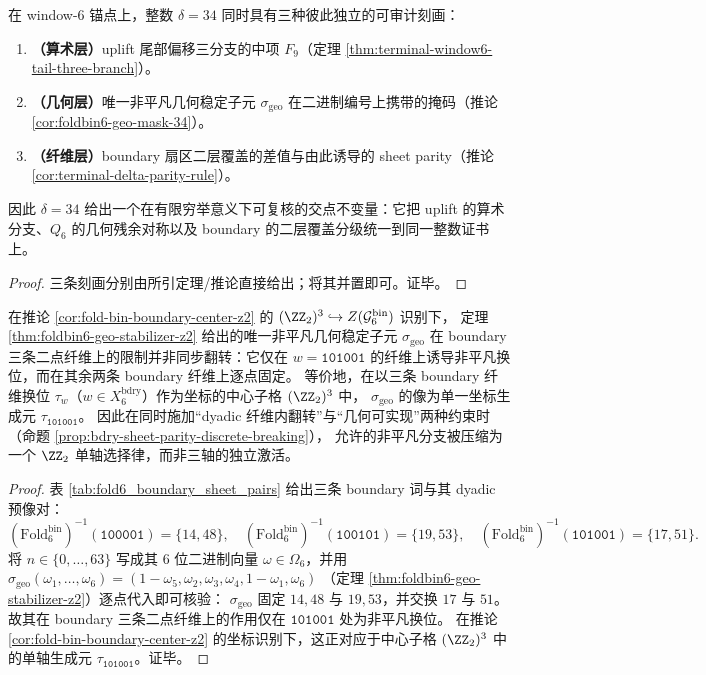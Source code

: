 \begin{corollary}[\texorpdfstring{$\delta=34$}{δ=34} 的三重同一性（算术/几何/纤维）]\label{cor:bdry-delta34-triple-identity}
在 window-\(6\) 锚点上，整数 \(\delta=34\) 同时具有三种彼此独立的可审计刻画：
\begin{enumerate}
  \item \textbf{（算术层）}uplift 尾部偏移三分支的中项 \(F_9\)（定理 \ref{thm:terminal-window6-tail-three-branch}）。
  \item \textbf{（几何层）}唯一非平凡几何稳定子元 \(\sigma_{\mathrm{geo}}\) 在二进制编号上携带的掩码（推论 \ref{cor:foldbin6-geo-mask-34}）。
  \item \textbf{（纤维层）}boundary 扇区二层覆盖的差值与由此诱导的 sheet parity（推论 \ref{cor:terminal-delta-parity-rule}）。
\end{enumerate}
因此 \(\delta=34\) 给出一个在有限穷举意义下可复核的交点不变量：它把 uplift 的算术分支、\(Q_6\) 的几何残余对称以及 boundary 的二层覆盖分级统一到同一整数证书上。
\end{corollary}
\begin{proof}
三条刻画分别由所引定理/推论直接给出；将其并置即可。证毕。
\end{proof}

\begin{corollary}\label{cor:bdry-sheet-parity-diagonal}
在推论 \ref{cor:fold-bin-boundary-center-z2} 的 \((\ZZ_2)^3\hookrightarrow Z(\mathcal{G}^{\mathrm{bin}}_6)\) 识别下，
定理 \ref{thm:foldbin6-geo-stabilizer-z2} 给出的唯一非平凡几何稳定子元 \(\sigma_{\mathrm{geo}}\)
在 boundary 三条二点纤维上的限制并非同步翻转：它仅在 \(w=\texttt{101001}\) 的纤维上诱导非平凡换位，而在其余两条 boundary 纤维上逐点固定。
等价地，在以三条 boundary 纤维换位 \(\tau_w\)（\(w\in X_6^{\mathrm{bdry}}\)）作为坐标的中心子格 \((\ZZ_2)^3\) 中，
\(\sigma_{\mathrm{geo}}\) 的像为单一坐标生成元 \(\tau_{\texttt{101001}}\)。
因此在同时施加“dyadic 纤维内翻转”与“几何可实现”两种约束时（命题 \ref{prop:bdry-sheet-parity-discrete-breaking}），
允许的非平凡分支被压缩为一个 \(\ZZ_2\) 单轴选择律，而非三轴的独立激活。
\end{corollary}
\begin{proof}
表 \ref{tab:fold6_boundary_sheet_pairs} 给出三条 boundary 词与其 dyadic 预像对：
\[
(\mathrm{Fold}^{\mathrm{bin}}_6)^{-1}(\texttt{100001})=\{14,48\},\quad
(\mathrm{Fold}^{\mathrm{bin}}_6)^{-1}(\texttt{100101})=\{19,53\},\quad
(\mathrm{Fold}^{\mathrm{bin}}_6)^{-1}(\texttt{101001})=\{17,51\}.
\]
将 \(n\in\{0,\dots,63\}\) 写成其 \(6\) 位二进制向量 \(\omega\in\Omega_6\)，并用
\(\sigma_{\mathrm{geo}}(\omega_1,\dots,\omega_6)=(1-\omega_5,\omega_2,\omega_3,\omega_4,1-\omega_1,\omega_6)\)
（定理 \ref{thm:foldbin6-geo-stabilizer-z2}）逐点代入即可核验：
\(\sigma_{\mathrm{geo}}\) 固定 \(14,48\) 与 \(19,53\)，并交换 \(17\) 与 \(51\)。
故其在 boundary 三条二点纤维上的作用仅在 \(\texttt{101001}\) 处为非平凡换位。
在推论 \ref{cor:fold-bin-boundary-center-z2} 的坐标识别下，这正对应于中心子格 \((\ZZ_2)^3\) 中的单轴生成元 \(\tau_{\texttt{101001}}\)。证毕。
\end{proof}

